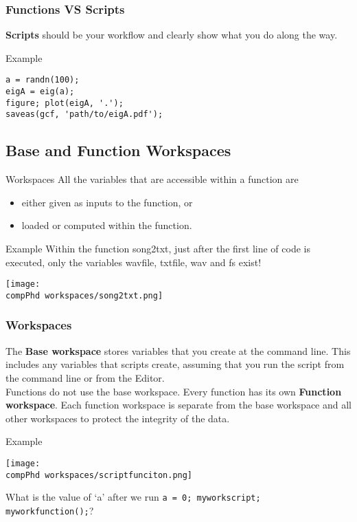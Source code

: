 \documentclass[]{beamer} %
\def\pathbase{/Users/pmxal9/} 	%
\def\pathbase{/Users/pmaal/} 	%
\edef\drop{\pathbase Dropbox/}		%
\edef\compPhd{\drop Nottingham/repos/phd/Seminars/+MatlabComputationalPhD/}
\begin{document}
\begin{frame}[fragile]%
\centering
\frametitle{Functions VS Scripts}
\begin{block}{\textbf{Scripts} should be your workflow }
and clearly show what you do along the way.
\end{block}
\begin{exampleblock}{Example}
\vspace{-4mm}
\begin{verbatim}a = randn(100); 
eigA = eig(a); 
figure; plot(eigA, '.');
saveas(gcf, 'path/to/eigA.pdf');
\end{verbatim}
\end{exampleblock}
\end{frame}


\subsection{Base and Function Workspaces}
\begin{frame}{Workspaces}%
All the variables that are accessible within a function are
\begin{itemize}
\item either given as inputs to the function, or
\item loaded or computed within the function.\\[3mm]
\end{itemize}
\begin{exampleblock}{Example}%
{Within the function song2txt, }%
just after the first line of code is executed, only the variables wavfile, txtfile, wav and fs 
exist! \\[2mm]
\begin{center}\texttt{[image: \\compPhd workspaces/song2txt.png]}\end{center}
\end{exampleblock}
\end{frame}


\begin{frame}[fragile]%
\frametitle{Workspaces}
The \textbf{Base workspace} stores variables that you create at the command line. 
This includes any variables that scripts create, assuming that you run the script from the command line or from the Editor.\\[3mm]

Functions do not use the base workspace. Every function has its own \textbf{Function workspace}. 
Each function workspace is separate from the base workspace and all other workspaces to protect the integrity of the data.
\pause
\begin{exampleblock}{Example}%
\begin{center}\texttt{[image: \\compPhd workspaces/scriptfunciton.png]}\end{center}
What is the value of `a' after we run 
\verb+a = 0; myworkscript; myworkfunction();+? 
\end{exampleblock}
\end{frame}
\end{document}
